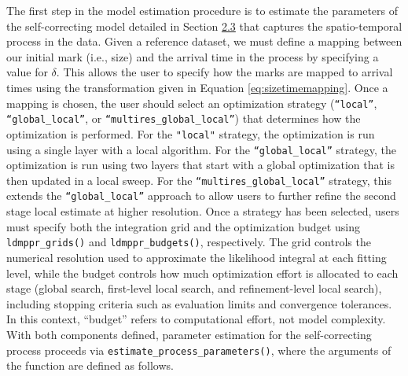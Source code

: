 {The first step in the model estimation procedure is to estimate the
parameters of the self-correcting model detailed in Section \hyperref[selfcorrecting]{2.3} that captures the spatio-temporal process in the
data. Given a reference dataset, we must define a mapping between our
initial mark (i.e., size) and the arrival time in the process by specifying a value for \(\delta\). This allows the user to
specify how the marks are mapped to arrival times using the
transformation given in Equation \eqref{eq:sizetimemapping}. Once a mapping is
chosen, the user should select an optimization strategy (\texttt{“local”}, \texttt{“global\_local”}, or \texttt{“multires\_global\_local”}) that determines how the optimization is performed. For the \texttt{"local"} strategy, the optimization is run using a single layer with a local algorithm. For the \texttt{“global\_local”} strategy, the optimization is run using two layers that start with a global optimization that is then updated in a local sweep. For the \texttt{“multires\_global\_local”} strategy, this extends the \texttt{“global\_local”} approach to allow users to further refine the second stage local estimate at higher resolution. Once a strategy has been selected, users must specify both the integration grid and the optimization budget using \texttt{ldmppr\_grids()} and \texttt{ldmppr\_budgets()}, respectively. The grid controls the numerical resolution used to approximate the likelihood integral at each fitting level, while the budget controls how much optimization effort is allocated to each stage (global search, first-level local search, and refinement-level local search), including stopping criteria such as evaluation limits and convergence tolerances. In this context, ``budget'' refers to computational effort, not model complexity. With both components defined, parameter estimation for the self-correcting process proceeds via \texttt{estimate\_process\_parameters()}, where the arguments of the function are defined as follows.}


